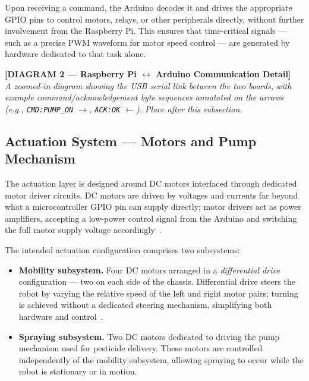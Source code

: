 Upon receiving a command, the Arduino decodes it and drives the
appropriate GPIO pins to control motors, relays, or other peripherals
directly, without further involvement from the Raspberry Pi. This
ensures that time-critical signals — such as a precise PWM waveform
for motor speed control — are generated by hardware dedicated to
that task alone.
 
\bigskip
\noindent\textbf{[DIAGRAM 2 — Raspberry Pi $\leftrightarrow$ Arduino
Communication Detail]}\\
\textit{A zoomed-in diagram showing the USB serial link between the
two boards, with example command/acknowledgement byte sequences
annotated on the arrows (e.g., \texttt{CMD:PUMP\_ON} $\rightarrow$,
\texttt{ACK:OK} $\leftarrow$). Place after this subsection.}
\bigskip
 
\subsection{Actuation System — Motors and Pump Mechanism}
 
The actuation layer is designed around DC motors interfaced through
dedicated motor driver circuits. DC motors are driven by voltages and
currents far beyond what a microcontroller GPIO pin can supply
directly; motor drivers act as power amplifiers, accepting a
low-power control signal from the Arduino and switching the full motor
supply voltage accordingly~\cite{monk2016electronics}.
 
The intended actuation configuration comprises two subsystems:
 
\begin{itemize}
    \item \textbf{Mobility subsystem.} Four DC motors arranged in a
          \emph{differential drive} configuration — two on each side
          of the chassis. Differential drive steers the robot by
          varying the relative speed of the left and right motor
          pairs; turning is achieved without a dedicated steering
          mechanism, simplifying both hardware and
          control~\cite{siegwart2011mobile}.
 
    \item \textbf{Spraying subsystem.} Two DC motors dedicated to
          driving the pump mechanism used for pesticide delivery.
          These motors are controlled independently of the mobility
          subsystem, allowing spraying to occur while the robot is
          stationary or in motion.
\end{itemize}
 
